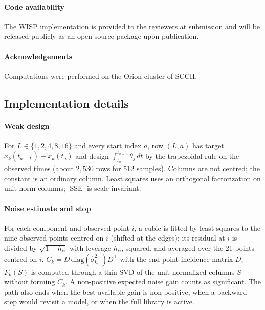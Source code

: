\documentclass[10pt]{article}
\newcommand{\SSE}{\operatorname{SSE}}
\begin{document}
\paragraph{Code availability} The WISP implementation is provided to the reviewers at submission and will be released
publicly as an open-source package upon publication.

\paragraph{Acknowledgements} Computations were performed on the Orion cluster of SCCH.

\begin{appendices}

\section{Implementation details}\label{app:impl}

\paragraph{Weak design} For $L\in\{1,2,4,8,16\}$ and every start index $a$, row $(L,a)$ has target
$x_k(t_{a+L})-x_k(t_a)$ and design $\int_{t_a}^{t_{a+L}}\theta_j\,dt$ by the trapezoidal rule on the observed times
(about $2{,}530$ rows for 512 samples). Columns are not centred; the constant is an ordinary column. Least squares uses an
orthogonal factorization on unit-norm columns; $\SSE$ is scale invariant.

\paragraph{Noise estimate and stop} For each component and observed point $i$, a cubic is fitted by least squares to the
nine observed points centred on $i$ (shifted at the edges); its residual at $i$ is divided by $\sqrt{1-h_{ii}}$ with
leverage $h_{ii}$, squared, and averaged over the 21 points centred on $i$.
$C_k=D\,\mathrm{diag}(\hat\sigma^2_{k,\cdot})D^\top$ with the end-point incidence matrix $D$; $F_k(S)$ is computed
through a thin SVD of the unit-normalized columns $S$ without forming $C_k$. A non-positive expected noise gain counts
as significant. The path also ends when the best available gain is non-positive, when a backward step would revisit a
model, or when the full library is active.


\end{appendices}
\end{document}
